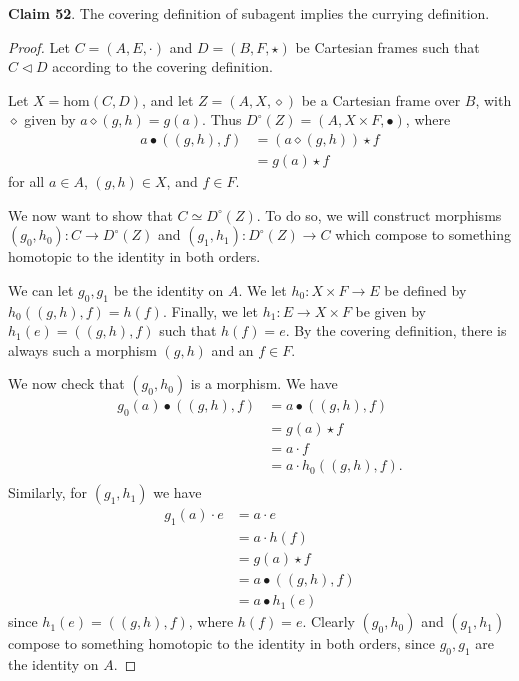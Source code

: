 \documentclass{article}
\begin{document}
\bigskip
\noindent \textbf{Claim 52}.
The covering definition of subagent implies the currying definition.

\begin{proof}
Let $C=(A, E, \cdot)$ and $D=(B, F, \star)$ be Cartesian frames such that $C \triangleleft D$ according to the covering definition.

Let $X = \text{hom}(C, D)$, and let $Z=(A, X, \diamond)$ be a Cartesian frame over $B$, with $\diamond$ given by $a \diamond (g, h) = g(a)$.
Thus $D^{\circ}(Z)=(A, X \times F, \bullet)$, where 
\begin{align*}
    a \bullet ((g, h), f) & = (a \diamond (g, h)) \star f \\
                          & = g(a) \star f
\end{align*}
for all $a \in A$, $(g, h) \in X$, and $f \in F$.

We now want to show that $C \simeq D^{\circ}(Z)$.
To do so, we will construct morphisms $(g_0, h_0): C \to D^{\circ}(Z)$ and $(g_1, h_1): D^{\circ}(Z) \to C$ which compose to something homotopic to the identity in both orders.

We can let $g_0, g_1$ be the identity on $A$.
We let $h_0: X \times F \to E$ be defined by $h_0((g,h), f) = h(f)$.
Finally, we let $h_1 : E \to X \times F$ be given by $h_1(e) = ((g, h), f)$ such that $h(f)=e$.
By the covering definition, there is always such a morphism $(g, h)$ and an $f \in F$.

We now check that $(g_0, h_0)$ is a morphism.
We have
\begin{align*}
    g_0(a) \bullet ((g, h), f) & = a \bullet ((g, h), f) \\
                               & = g(a) \star f \\
                               & = a \cdot f \\
                               & = a \cdot h_0((g, h), f). \\
\end{align*}
Similarly, for $(g_1, h_1)$ we have
\begin{align*}
    g_1(a) \cdot e & = a \cdot e \\
                   & = a \cdot h(f) \\
                   & = g(a) \star f \\
                   & = a \bullet ((g, h), f) \\
                   & = a \bullet h_1(e)
\end{align*}
since $h_1(e) = ((g, h), f)$, where $h(f)=e$. Clearly $(g_0, h_0)$ and $(g_1, h_1)$ compose to something homotopic to the identity in both orders, since $g_0, g_1$ are the identity on $A$.

\end{proof}
\end{document}
